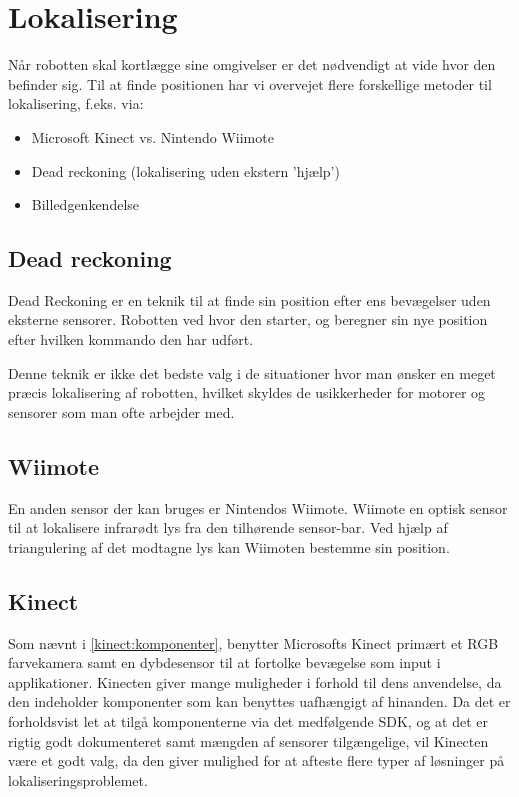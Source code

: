 \section{Lokalisering}
Når robotten skal kortlægge sine omgivelser er det nødvendigt at vide hvor den befinder sig.
Til at finde positionen har vi overvejet flere forskellige metoder til lokalisering, f.eks. via:
\begin{itemize}
\item Microsoft Kinect vs. Nintendo Wiimote
\item Dead reckoning (lokalisering uden ekstern 'hjælp')
\item Billedgenkendelse
\end{itemize}

\subsection{Dead reckoning}
Dead Reckoning er en teknik til at finde sin position efter ens bevægelser uden eksterne sensorer.
Robotten ved hvor den starter, og beregner sin nye position efter hvilken kommando den har udført.\cite{deadrec}

Denne teknik er ikke det bedste valg i de situationer hvor man ønsker en meget præcis lokalisering af robotten, hvilket skyldes de usikkerheder for motorer og sensorer som man ofte arbejder med.

\subsection{Wiimote}
En anden sensor der kan bruges er Nintendos Wiimote. 
Wiimote en optisk sensor til at lokalisere infrarødt lys fra den tilhørende sensor-bar.
Ved hjælp af triangulering af det modtagne lys kan Wiimoten bestemme sin position. \cite{wiimote}

\subsection{Kinect }
Som nævnt i \cref{kinect:komponenter}, benytter Microsofts Kinect primært et RGB farvekamera samt en dybdesensor til at fortolke bevægelse som input i applikationer.
Kinecten giver mange muligheder i forhold til dens anvendelse, da den indeholder komponenter som kan benyttes uafhængigt af hinanden. 
Da det er forholdsvist let at tilgå komponenterne via det medfølgende SDK, og at det er rigtig godt dokumenteret samt mængden af sensorer tilgængelige, vil Kinecten være et godt valg, da den giver mulighed for at afteste flere typer af løsninger på lokaliseringsproblemet.


